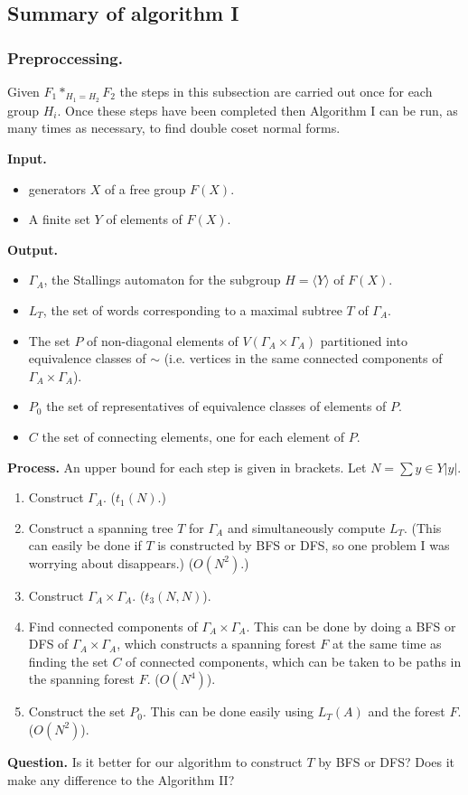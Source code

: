 \documentclass[a4paper,12pt]{article}
\newcommand{\G}{\Gamma }
\numberwithin{equation}{section}
\numberwithin{figure}{section}
\newcommand{\la}{\langle}
\newcommand{\ra}{\rangle}
\newcommand{\be}{\begin{enumerate}}
\newcommand{\ee}{\end{enumerate}}
\newcommand{\biz}{\begin{itemize}}
\newcommand{\eiz}{\end{itemize}}
\begin{document}
\subsection{Summary of algorithm I}
\subsubsection{Preproccessing.}
Given $F_1*_{H_1=H_2} F_2$
 the 
steps in this subsection are carried out once for 
each group $H_i$. Once these steps have been completed
then Algorithm I can be run, as many times as necessary,
to find double coset normal forms.
 
\noindent\textbf{Input.}
\biz
\item generators $X$ of a free group $F(X)$.
\item A finite set $Y$ of elements of $F(X)$.
\eiz
\noindent\textbf{Output.}
\biz
\item 
$\G_A$, the Stallings automaton for the subgroup $H=\la Y\ra$ of $F(X)$.
\item
$L_T$, the set of words corresponding to a  maximal subtree $T$ of $\G_A$.
\item The set $P$ of non-diagonal elements of $V( \G_A\times \G_A)$ 
partitioned into equivalence classes of $\sim$ (i.e. vertices in the
same connected components of $\G_A\times \G_A$).
\item $P_0$ the set of representatives of equivalence classes of 
elements of $P$.
\item $C$ the set of connecting elements, one for each element of $P$.
\eiz
\noindent\textbf{Process.}
An upper bound for each step is given in brackets.
Let $N=\sum{y\in Y} |y|$.
\be
\item Construct $\G_A$. ($t_1(N)$.)
\item Construct a spanning tree $T$ for $\G_A$ and simultaneously
compute $L_T$. (This can easily be done if $T$ is constructed by
BFS or DFS, so one problem I was worrying about disappears.) ($O(N^2)$.)
\item Construct $\G_A\times \G_A$. ($t_3(N,N)$).
\item Find connected components of $\G_A\times \G_A$. This can be
done by doing a BFS or DFS of $\G_A\times \G_A$, which constructs
a spanning forest $F$ at the same time as finding the set $C$ of
connected components,
which can be taken to be paths in the spanning forest $F$. 
($O(N^4)$).
\item Construct the set $P_0$. This can be done easily using $L_T(A)$ and
the forest $F$. ($O(N^2)$).  
\ee
\noindent\textbf{Question.} Is it better for our algorithm
to construct $T$ by BFS or DFS? Does it make any difference to the 
Algorithm II? 
\end{document}
